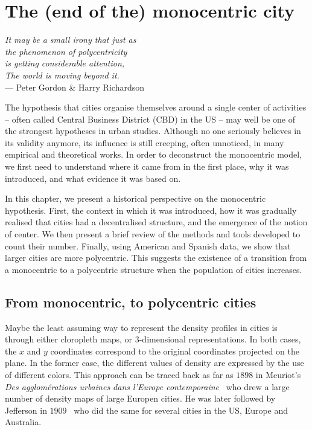 %
\chapter{The (end of the) monocentric city}
\label{chap:monocentric_introduction}

\begin{flushright}{\slshape    
It may be a small irony that  
just as\\
the phenomenon of polycentricity\\ is getting considerable attention,\\
The world is moving beyond it.} \\ \medskip
--- Peter Gordon \& Harry Richardson~\cite{Gordon:1996}
\end{flushright}


\bigskip


The hypothesis that cities organise themselves around a single center of
activities -- often called Central Business District (CBD) in the US -- may well
be one of the strongest hypotheses in urban studies. Although no one seriously
believes in its validity anymore, its influence is still creeping, often
unnoticed, in many empirical and theoretical works.  In order to deconstruct the
monocentric model, we first need to understand where it came from in the first
place, why it was introduced, and what evidence it was based on. 

In this chapter, we present a historical perspective on the monocentric
hypothesis. First, the context in which it was introduced, how it was gradually
realised that cities had a decentralised structure, and the emergence of the
notion of center. We then present a brief review of the methods and tools
developed to count their number. Finally, using American and Spanish data, we
show that larger cities are more polycentric. This suggests the existence of a
transition from a monocentric to a polycentric structure when the population of
cities increases.

\section{From monocentric, to polycentric cities}
\label{sec:introduction}

Maybe the least assuming way to represent the density profiles in cities is
through either cloropleth maps, or 3-dimensional representations. In both cases,
the $x$ and $y$ coordinates correspond to the original coordinates projected on
the plane. In the former case, the different values of density are expressed by
the use of different colors. This approach can be traced back as far as $1898$
in Meuriot's \emph{Des agglom\'erations urbaines dans l'Europe
contemporaine}~\cite{Meuriot:1898} who drew a large number of density maps of
large Europen cities. He was later followed by Jefferson in
$1909$~\cite{Jefferson:1909} who did the same for several cities in the US,
Europe and Australia.\\


